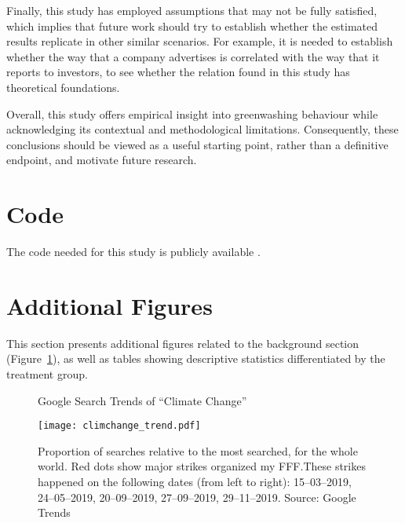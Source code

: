 \documentclass[12pt]{article}
\begin{document}
Finally, this study has employed assumptions that may not be fully satisfied, which implies that future work should try to establish whether the estimated results replicate in other similar scenarios. For example, it is needed to establish whether the way that a company advertises is correlated with the way that it reports to investors, to see whether the relation found in this study has theoretical foundations. 

Overall, this study offers empirical insight into greenwashing behaviour while acknowledging its contextual and methodological limitations. Consequently, these conclusions should be viewed as a useful starting point, rather than a definitive endpoint, and motivate future research.



\pagebreak
\printbibliography{}
\pagebreak
\appendix

\section{Code}

The code needed for this study is publicly available \href{https://github.com/pszewi/thesis}{}.

\renewcommand\thetable{\thesection.\arabic{table}}
\renewcommand\thefigure{\thesection.\arabic{figure}}
\setcounter{table}{0}
\setcounter{figure}{0}

\section{Additional Figures}\label{app:extra_figs}



This section presents additional figures related to the background section (Figure~\ref{fig:cc_trend}), as well as tables showing descriptive statistics differentiated by the treatment group.

\vfill{}
\centering

\begin{figure}[ht]

    \caption{Google Search Trends of ``Climate Change''}\label{fig:cc_trend}
    \texttt{[image: climchange\_trend.pdf]}
    \captionsetup{font=footnotesize}
    \caption*{Proportion of searches relative to the most searched, for the whole world. Red dots show major strikes organized my FFF.\@ These strikes happened on the following dates (from left to right): 15--03--2019, 24--05--2019, 20--09--2019, 27--09--2019, 29--11--2019. Source: Google Trends}
\end{figure}
\end{document}
